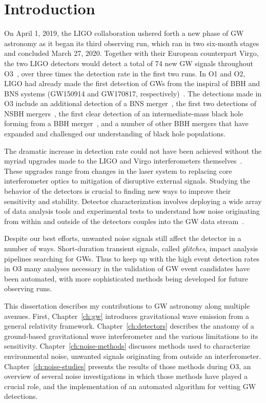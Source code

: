 \chapter{Introduction}

On April 1, 2019, the \ac{LIGO} collaboration ushered forth a new phase of \ac{GW} astronomy as it began its third observing run, which ran in two six-month stages and concluded March 27, 2020.
Together with their European counterpart Virgo, the two \ac{LIGO} detectors would detect a total of 74 new \ac{GW} signals throughout \ac{O3}~\citep{gwtc2, gwtc3}, over three times the detection rate in the first two runs.
In \ac{O1} and \ac{O2}, \ac{LIGO} had already made the first detection of \acp{GW} from the inspiral of \ac{BBH} and \ac{BNS} systems (GW150914 and GW170817, respectively)~\citep{gw150914, gw170817}.
The detections made in \ac{O3} include an additional detection of a \ac{BNS} merger~\citep{gw190425}, the first two detections of \ac{NSBH} mergers~\citep{nsbh_o3}, the first clear detection of an intermediate-mass black hole forming from a \ac{BBH} merger~\citep{gw190521}, and a number of other \ac{BBH} mergers that have expanded and challenged our understanding of black hole populations.

The dramatic increase in detection rate could not have been achieved without the myriad upgrades made to the LIGO and Virgo interferometers themselves~\citep{Buikema_2020}.
These upgrades range from changes in the laser system to replacing core interferometer optics to mitigation of disruptive external signals.
Studying the behavior of the detectors is crucial to finding new ways to improve their sensitivity and stability.
Detector characterization involves deploying a wide array of data analysis tools and experimental tests to understand how noise originating from within and outside of the detectors couples into the \ac{GW} data stream~\citep{Davis_2019, Davis_2021}.

Despite our best efforts, unwanted noise signals still affect the detector in a number of ways.
Short-duration transient signals, called \textit{glitches}, impact analysis pipelines searching for \acp{GW}.
Thus to keep up with the high event detection rates in \ac{O3} many analyses necessary in the validation of \ac{GW} event candidates have been automated, with more sophisticated methods being developed for future observing runs.

This dissertation describes my contributions to \ac{GW} astronomy along multiple avenues. First, Chapter~\ref{ch:gw} introduces gravitational wave emission from a general relativity framework. Chapter~\ref{ch:detectors} describes the anatomy of a ground-based gravitational wave interferometer and the various limitations to its sensitivity. Chapter~\ref{ch:noise-methods} discusses methods used to characterize environmental noise, unwanted signals originating from outside an interferometer. Chapter~\ref{ch:noise-studies} presents the results of those methods during O3, an overview of several noise investigations in which those methods have played a crucial role, and the implementation of an automated algorithm for vetting \ac{GW} detections.

